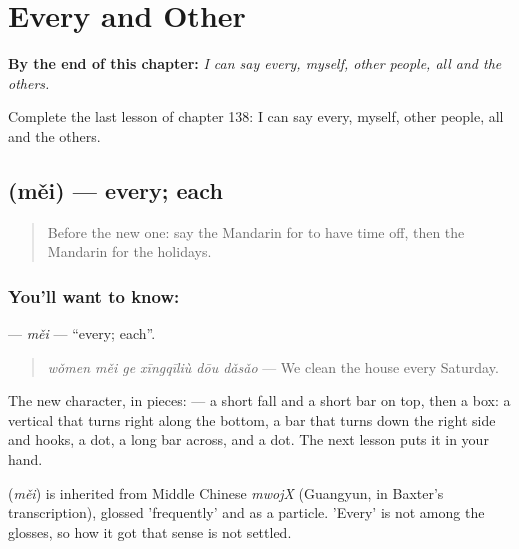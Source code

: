 
\chapter{Every and Other}
\label{ch:zh-every-and-other}

\begin{chapteropening}
\textbf{By the end of this chapter:} \emph{I can say every, myself, other people, all and the others.}

Complete the last lesson of chapter 138: I can say every, myself, other people, all and the others.
\end{chapteropening}

\section[\texorpdfstring{\zh{每} (měi)}{每 (měi)}]{ (měi) — every; each}

\label{lesson:ZH-C138-mei}



\begin{quote}
Before the new one: say the Mandarin for to have time off, then the Mandarin for the holidays.
\end{quote}

\subsection*{You'll want to know: }
\textbf{} — \emph{měi} — \textquotedblleft{}every; each\textquotedblright{}.

\begin{quote}
\textbf{} \emph{wǒmen měi ge xīngqīliù dōu dǎsǎo} — We clean the house every Saturday.
\end{quote}

The new character, in pieces:  — a short fall and a short bar on top, then a box: a vertical that turns right along the bottom, a bar that turns down the right side and hooks, a dot, a long bar across, and a dot. The next lesson puts it in your hand.

\begin{cousinweb}
\textbf{} (\emph{měi}) is inherited from Middle Chinese \emph{mwojX} (Guangyun, in Baxter's transcription), glossed 'frequently' and as a particle. 'Every' is not among the glosses, so how it got that sense is not settled.
\end{cousinweb}

